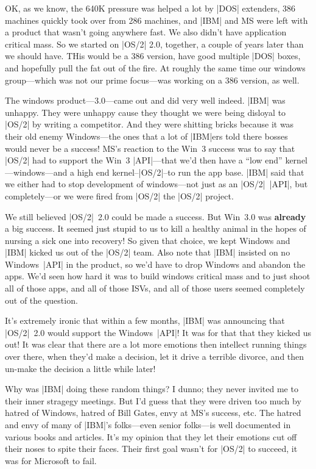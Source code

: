 OK, as we know, the 640K pressure was helped a lot by |DOS| extenders,
386 machines quickly took over from 286 machines, and |IBM| and MS were
left with a product that wasn't going anywhere fast.  We also didn't
have application critical mass.  So we started on |OS/2| 2.0, together,
a couple of years later than we should have.  THis would be a 386
version, have good multiple |DOS| boxes, and hopefully pull the fat out of
the fire.  At roughly the same time our windows group---which was not
our prime focus---was working on a 386 version, as well.

The windows product---3.0---came out and did very well indeed.  |IBM|
was unhappy.  They were unhappy cause they thought we were being disloyal
to |OS/2| by writing a competitor.  And they were shitting bricks because it
was their old enemy Windows---the ones that a lot of |IBM|ers
told there bosses would never be a success!  MS's reaction to the Win~3
success was to say that |OS/2| had to support the Win~3 |API|---that we'd
then have a ``low end'' kernel---windows---and a high end kernel--|OS/2|--to
run the app base.  |IBM| said that we either had to stop development of
windows---not just as an |OS/2|~|API|, but completely---or
we were fired from |OS/2| the |OS/2| project.

We still believed |OS/2|~2.0 could be made a success.  But Win~3.0 was
{\bf already} a big success.  It seemed just stupid to us to kill a healthy
animal in the hopes of nursing a sick one into recovery!  So given that
choice, we kept Windows and |IBM| kicked us out of the |OS/2| team.  Also
note that |IBM| insisted on no Windows~|API| in the product, so we'd have
to drop Windows and abandon the apps.  We'd seen how hard it was to
build windows critical mass and to just shoot all of those apps, 
and all of those ISVs, and all of those users seemed completely out of
the question.

It's extremely ironic that within a few months, |IBM| was announcing that
|OS/2|~2.0 would support the Windows~|API|!  It was for that that they
kicked us out!  It was clear that there are a lot more emotions then
intellect running things over there, when they'd make a decision, let
it drive a terrible divorce, and then un-make the decision a little while
later!  

Why was |IBM| doing these random things?  I dunno; they never invited me to
their inner stragegy meetings.  But I'd guess that they were driven too
much by hatred of Windows, hatred of Bill Gates, envy at MS's success, etc.
The hatred and envy of many of |IBM|'s folks---even senior folks---is well
documented in various books and articles.  It's my opinion that they
let their emotions cut off their noses to spite their faces.  Their first
goal wasn't for |OS/2| to succeed, it was for Microsoft to fail.

